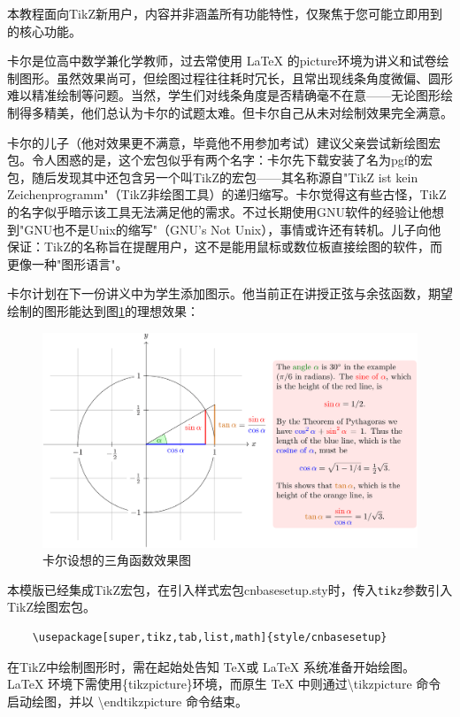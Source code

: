 本教程面向TikZ新用户，内容并非涵盖所有功能特性，仅聚焦于您可能立即用到的核心功能。

卡尔是位高中数学兼化学教师，过去常使用 \LaTeX{} 的picture环境为讲义和试卷绘制图形。虽然效果尚可，但绘图过程往往耗时冗长，且常出现线条角度微偏、圆形难以精准绘制等问题。当然，学生们对线条角度是否精确毫不在意——无论图形绘制得多精美，他们总认为卡尔的试题太难。但卡尔自己从未对绘制效果完全满意。

卡尔的儿子（他对效果更不满意，毕竟他不用参加考试）建议父亲尝试新绘图宏包。令人困惑的是，这个宏包似乎有两个名字：卡尔先下载安装了名为pgf的宏包，随后发现其中还包含另一个叫TikZ的宏包——其名称源自"TikZ ist kein Zeichenprogramm"（TikZ非绘图工具）的递归缩写。卡尔觉得这有些古怪，TikZ的名字似乎暗示该工具无法满足他的需求。不过长期使用GNU软件的经验让他想到"GNU也不是Unix的缩写"（GNU's Not Unix），事情或许还有转机。儿子向他保证：TikZ的名称旨在提醒用户，这不是能用鼠标或数位板直接绘图的软件，而更像一种"图形语言"。

\begin{example}卡尔计划在下一份讲义中为学生添加图示。他当前正在讲授正弦与余弦函数，期望绘制的图形能达到图\ref{fig:karl-sine-problem}的理想效果：
\begin{figure}[!hpbt]
    \centering
    \includegraphics[scale=0.75]{doc/figures/image-5.png}
    \caption[卡尔设想的三角函数效果图]{\enspace 卡尔设想的三角函数效果图}
    \label{fig:karl-sine-problem}
\end{figure}
\end{example}


本模版已经集成TikZ宏包，在引入样式宏包cnbasesetup.sty时，传入\texttt{tikz}参数引入TikZ绘图宏包。
\begin{verbatim}
    \usepackage[super,tikz,tab,list,math]{style/cnbasesetup}
\end{verbatim}
在TikZ中绘制图形时，需在起始处告知 \TeX 或 \LaTeX{} 系统准备开始绘图。
\LaTeX{} 环境下需使用\{tikzpicture\}环境，而原生 \TeX{} 中则通过\backslash tikzpicture 命令启动绘图，并以 \backslash endtikzpicture 命令结束。

